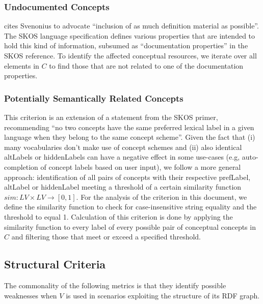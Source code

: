 \subsubsection{Undocumented Concepts}
\cite{Aitchison2000} cites Svenonius to advocate ``inclusion of as much definition material as possible''. The SKOS language specification defines various properties that are intended to hold this kind of information, subsumed as ``documentation properties'' in the SKOS reference. To identify the affected conceptual resources, we iterate over all elements in $C$ to find those that are not related to one of the documentation properties.

\subsubsection{Potentially Semantically Related Concepts} 
This criterion is an extension of a statement from the SKOS primer, recommending ``no two concepts have the same preferred lexical label in a given language when they belong to the same concept scheme''. Given the fact that (i) many vocabularies don’t make use of concept schemes and (ii) also identical altLabels or hiddenLabels can have a negative effect in some use-cases (e.g, auto-completion of concept labels based on user input), we follow a more general approach: identification of all pairs of concepts with their respective prefLabel, altLabel or hiddenLabel meeting a threshold of a certain similarity function $sim:LV \times LV \rightarrow [0,1]$. For the analysis of the criterion in this document, we define the similarity function  to check for case-insensitive string equality and the threshold to equal 1. Calculation of this criterion is done by applying the similarity function to every label of every possible pair of conceptual concepts in $C$ and filtering those that meet or exceed a specified threshold.


\subsection{Structural Criteria}

The commonality of the following metrics is that they identify possible weaknesses when $V$ is used in scenarios exploiting the structure of its RDF graph. 

